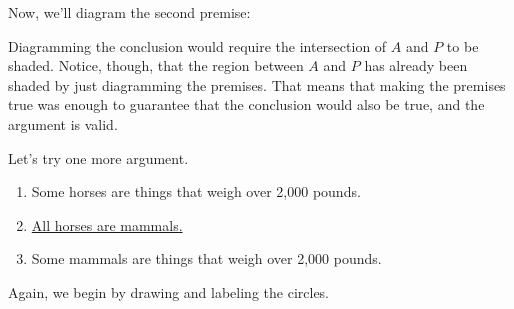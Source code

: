 \documentclass[../logic-text.tex]{subfiles}
\begin{document}
Now, we'll diagram the second premise:

\medskip
{}

Diagramming the conclusion would require the intersection of $A$ and $P$ to be shaded. Notice, though, that the region between $A$ and $P$ has already been shaded by just diagramming the premises. That means that making the premises true was enough to guarantee that the conclusion would also be true, and the argument is valid.


Let's try one more argument.

\begin{enumerate}
\item Some horses are things that weigh over 2,000 pounds.
\item \underline{All horses are mammals.}
\item Some mammals are things that weigh over 2,000 pounds.
\end{enumerate}

Again, we begin by drawing and labeling the circles.

\medskip
{}
\end{document}
